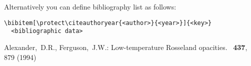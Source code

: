 \documentclass{aastex}
\begin{document}
\noindent Alternatively  you can define bibliography list as follows:

\smallskip
\begin{footnotesize}
\begin{verbatim}
\bibitem[\protect\citeauthoryear{<author>}{<year>}]{<key>} 
  <bibliographic data>
\end{verbatim}
\end{footnotesize}


\makeatletter
\let\clear@thebibliography@page=\relax
\makeatother

\begin{thebibliography}

Alexander,~D.R., Ferguson,~J.W.: 
Low-temperature Rosseland opacities.
\apj\ \textbf{437}, 879 (1994)


\end{thebibliography}
\end{document}

